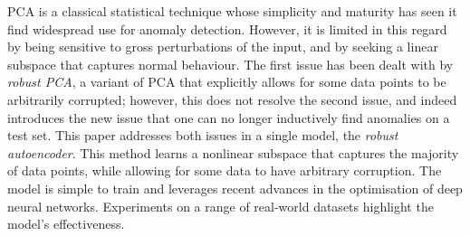 
PCA is a classical statistical technique whose simplicity and maturity has seen it find widespread use for anomaly detection.
However, it is limited in this regard by being sensitive to gross perturbations of the input, and by seeking a linear subspace that captures normal behaviour.
The first issue has been dealt with by \emph{robust PCA}, a variant of PCA that explicitly allows for some data points to be arbitrarily corrupted;
however, this does not resolve the second issue,
and indeed introduces the new issue that one can no longer inductively find anomalies on a test set.
This paper addresses both issues in a single model, the \emph{robust autoencoder}.
This method learns a nonlinear subspace that captures the majority of data points, while allowing for some data to have arbitrary corruption.
The model is simple to train and leverages recent advances in the optimisation of deep neural networks.
Experiments on a range of real-world datasets highlight the model's effectiveness.

